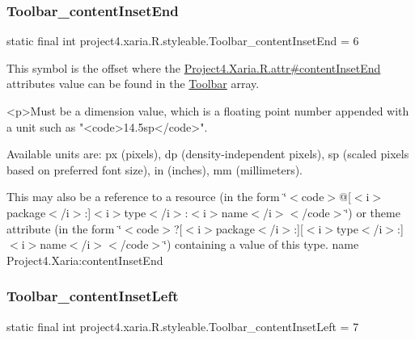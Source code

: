 \subsubsection{\texorpdfstring{Toolbar\+\_\+content\+Inset\+End}{Toolbar\_contentInsetEnd}}
{\footnotesize\ttfamily static final int project4.\+xaria.\+R.\+styleable.\+Toolbar\+\_\+content\+Inset\+End = 6\hspace{0.3cm}{\ttfamily [static]}}

This symbol is the offset where the \hyperlink{}{Project4.\+Xaria.\+R.\+attr\#content\+Inset\+End} attribute\textquotesingle{}s value can be found in the \hyperlink{classproject4_1_1xaria_1_1R_1_1styleable_af6c30f9e9e086f6bf4e510669443fa59}{Toolbar} array.

\begin{DoxyVerb}      <p>Must be a dimension value, which is a floating point number appended with a unit such as "<code>14.5sp</code>".
\end{DoxyVerb}
 Available units are\+: px (pixels), dp (density-\/independent pixels), sp (scaled pixels based on preferred font size), in (inches), mm (millimeters). 

This may also be a reference to a resource (in the form \char`\"{}$<$code$>$@\mbox{[}$<$i$>$package$<$/i$>$\+:\mbox{]}$<$i$>$type$<$/i$>$\+:$<$i$>$name$<$/i$>$$<$/code$>$\char`\"{}) or theme attribute (in the form \char`\"{}$<$code$>$?\mbox{[}$<$i$>$package$<$/i$>$\+:\mbox{]}\mbox{[}$<$i$>$type$<$/i$>$\+:\mbox{]}$<$i$>$name$<$/i$>$$<$/code$>$\char`\"{}) containing a value of this type.  name Project4.\+Xaria\+:content\+Inset\+End \mbox{\label{classproject4_1_1xaria_1_1R_1_1styleable_a2660e1510b54665063d64211023b050f}} 
\subsubsection{\texorpdfstring{Toolbar\+\_\+content\+Inset\+Left}{Toolbar\_contentInsetLeft}}
{\footnotesize\ttfamily static final int project4.\+xaria.\+R.\+styleable.\+Toolbar\+\_\+content\+Inset\+Left = 7\hspace{0.3cm}{\ttfamily [static]}}

